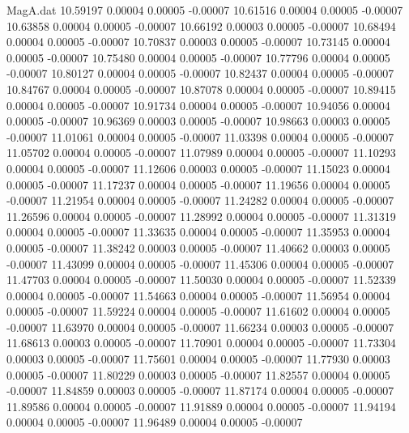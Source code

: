 \begin{filecontents}{MagA.dat}
  10.59197    0.00004    0.00005   -0.00007
  10.61516    0.00004    0.00005   -0.00007
  10.63858    0.00004    0.00005   -0.00007
  10.66192    0.00003    0.00005   -0.00007
  10.68494    0.00004    0.00005   -0.00007
  10.70837    0.00003    0.00005   -0.00007
  10.73145    0.00004    0.00005   -0.00007
  10.75480    0.00004    0.00005   -0.00007
  10.77796    0.00004    0.00005   -0.00007
  10.80127    0.00004    0.00005   -0.00007
  10.82437    0.00004    0.00005   -0.00007
  10.84767    0.00004    0.00005   -0.00007
  10.87078    0.00004    0.00005   -0.00007
  10.89415    0.00004    0.00005   -0.00007
  10.91734    0.00004    0.00005   -0.00007
  10.94056    0.00004    0.00005   -0.00007
  10.96369    0.00003    0.00005   -0.00007
  10.98663    0.00003    0.00005   -0.00007
  11.01061    0.00004    0.00005   -0.00007
  11.03398    0.00004    0.00005   -0.00007
  11.05702    0.00004    0.00005   -0.00007
  11.07989    0.00004    0.00005   -0.00007
  11.10293    0.00004    0.00005   -0.00007
  11.12606    0.00003    0.00005   -0.00007
  11.15023    0.00004    0.00005   -0.00007
  11.17237    0.00004    0.00005   -0.00007
  11.19656    0.00004    0.00005   -0.00007
  11.21954    0.00004    0.00005   -0.00007
  11.24282    0.00004    0.00005   -0.00007
  11.26596    0.00004    0.00005   -0.00007
  11.28992    0.00004    0.00005   -0.00007
  11.31319    0.00004    0.00005   -0.00007
  11.33635    0.00004    0.00005   -0.00007
  11.35953    0.00004    0.00005   -0.00007
  11.38242    0.00003    0.00005   -0.00007
  11.40662    0.00003    0.00005   -0.00007
  11.43099    0.00004    0.00005   -0.00007
  11.45306    0.00004    0.00005   -0.00007
  11.47703    0.00004    0.00005   -0.00007
  11.50030    0.00004    0.00005   -0.00007
  11.52339    0.00004    0.00005   -0.00007
  11.54663    0.00004    0.00005   -0.00007
  11.56954    0.00004    0.00005   -0.00007
  11.59224    0.00004    0.00005   -0.00007
  11.61602    0.00004    0.00005   -0.00007
  11.63970    0.00004    0.00005   -0.00007
  11.66234    0.00003    0.00005   -0.00007
  11.68613    0.00003    0.00005   -0.00007
  11.70901    0.00004    0.00005   -0.00007
  11.73304    0.00003    0.00005   -0.00007
  11.75601    0.00004    0.00005   -0.00007
  11.77930    0.00003    0.00005   -0.00007
  11.80229    0.00003    0.00005   -0.00007
  11.82557    0.00004    0.00005   -0.00007
  11.84859    0.00003    0.00005   -0.00007
  11.87174    0.00004    0.00005   -0.00007
  11.89586    0.00004    0.00005   -0.00007
  11.91889    0.00004    0.00005   -0.00007
  11.94194    0.00004    0.00005   -0.00007
  11.96489    0.00004    0.00005   -0.00007

\end{filecontents}
